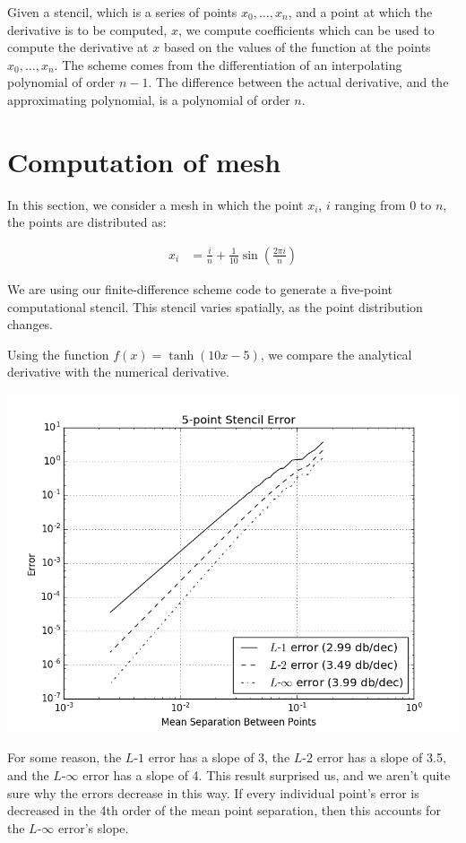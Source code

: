 \documentclass{article}
\begin{document}
Given a stencil, which is a series of points $x_0, \dots, x_n$, 
	and a point at which the derivative is to be computed,
	$x$, we compute coefficients which can be used to compute
	the derivative at $x$ based on the values of the function
	at the points $x_0, \dots, x_n$.
The scheme comes from the differentiation of an interpolating polynomial
	of order $n-1$.
The difference between the actual derivative, and the approximating
	polynomial, is a polynomial of order $n$.

\section{Computation of mesh}

In this section, we consider a mesh in which the point $x_i$, 
	$i$ ranging from $0$ to $n$, the points are distributed as:

\begin{align}
x_i & = \frac{i}{n} + \frac{1}{10} \sin \left( \frac{2 \pi i}{n} \right)
\end{align}

We are using our finite-difference scheme code to generate a five-point
	computational stencil.
This stencil varies spatially, as the point distribution changes.

Using the function $f(x) = \tanh ( 10 x - 5 )$, we compare the analytical
	derivative with the numerical derivative.

\includegraphics[width=\textwidth]{ErrorDecrease.png}

For some reason, the $L$-$1$ error has a slope of 3,
	the $L$-$2$ error has a slope of 3.5,
	and the $L$-$\infty$ error has a slope of 4.
This result surprised us, and we aren't quite sure why the errors
	decrease in this way.
If every individual point's error is decreased in the 4th order
	of the mean point separation, then this accounts for the
	$L$-$\infty$ error's slope.
\end{document}
